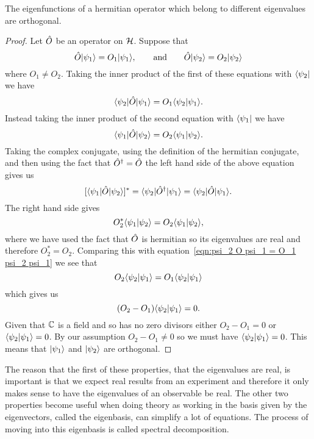     \begin{theorem}{}{}
        The eigenfunctions of a hermitian operator which belong to different eigenvalues are orthogonal.
    \end{theorem}
    \begin{proof}
        Let \(\hat{O}\) be an operator on \(\mathcal{H}\).
        Suppose that
        \[\hat{O}\vert {\psi_1} \rangle = O_1\vert {\psi_1} \rangle, \qquad\text{and}\qquad \hat{O}\vert {\psi_2} \rangle = O_2\vert {\psi_2} \rangle\]
        where \(O_1 \ne O_2\).
        Taking the inner product of the first of these equations with \(\langle {\psi_2} \vert\) we have
        \begin{equation}\label{eqn:psi_2 O psi_1 = O_1 psi_2 psi_1}
            \langle {\psi_2} \vert\hat{O}\vert {\psi_1} \rangle = O_1\langle {\psi_2} \vert {\psi_1} \rangle.
        \end{equation}
        Instead taking the inner product of the second equation with \(\langle {\psi_1} \vert\) we have
        \[\langle {\psi_1} \vert\hat{O}\vert {\psi_2} \rangle = O_2\langle {\psi_1} \vert {\psi_2} \rangle.\]
        Taking the complex conjugate, using the definition of the hermitian conjugate, and then using the fact that \(\hat{O}^\dagger = \hat{O}\) the left hand side of the above equation gives us
        \[[\langle {\psi_1} \vert\hat{O}\vert {\psi_2} \rangle]^* = \langle {\psi_2} \vert\hat{O}^\dagger\vert {\psi_1} \rangle = \langle {\psi_2} \vert\hat{O}\vert {\psi_1} \rangle.\]
        The right hand side gives
        \[O_2^*\langle {\psi_1} \vert {\psi_2} \rangle = O_2\langle {\psi_1} \vert {\psi_2} \rangle,\]
        where we have used the fact that \(\hat{O}\) is hermitian so its eigenvalues are real and therefore \(O_2^* = O_2\).
        Comparing this with equation~\ref{eqn:psi_2 O psi_1 = O_1 psi_2 psi_1} we see that
        \[O_2\langle {\psi_2} \vert {\psi_1} \rangle = O_1\langle {\psi_2} \vert {\psi_1} \rangle\]
        which gives us
        \[(O_2 - O_1)\langle {\psi_2} \vert {\psi_1} \rangle = 0.\]
        Given that \(\mathbb{C}\) is a field and so has no zero divisors either \(O_2 - O_1 = 0\) or \(\langle {\psi_2} \vert {\psi_1} \rangle = 0\).
        By our assumption \(O_2 - O_1\ne 0\) so we must have \(\langle {\psi_2} \vert {\psi_1} \rangle = 0\).
        This means that \(\vert {\psi_1} \rangle\) and \(\vert {\psi_2} \rangle\) are orthogonal.
    \end{proof}
    
    The reason that the first of these properties, that the eigenvalues are real, is important is that we expect real results from an experiment and therefore it only makes sense to have the eigenvalues of an observable be real.
    The other two properties become useful when doing theory as working in the basis given by the eigenvectors, called the eigenbasis, can simplify a lot of equations.
    The process of moving into this eigenbasis is called spectral decomposition.
    
